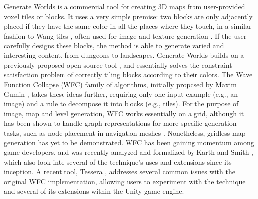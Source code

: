 \documentclass[journal]{IEEEtran}
\begin{document}
Generate Worlds \cite{dykeman2019introducing} is a commercial tool for creating 3D
maps from user-provided voxel tiles or blocks. It uses a very simple premise: two blocks
are only adjacently placed if they have the same color in all the places where they touch,
in a similar fashion to Wang tiles \cite{wang1961proving}, often used for image and
texture generation \cite{cohen2003wang,lagae2009wang}. If the user carefully designs
these blocks, the method is able to generate varied and interesting content, from dungeons
to landscapes. Generate Worlds builds on a previously proposed open-source tool
\cite{dykeman2017procedural}, and essentially solves the constraint satisfaction problem
of correctly tiling blocks according to their colors. The Wave Function Collapse (WFC)
family of algorithms, initially proposed by Maxim Gumin \cite{gumin2016wfc}, takes these
ideas further, requiring only one input example (e.g., an image) and a rule to decompose it
into blocks (e.g., tiles). For the purpose of image, map and level generation, WFC works
essentially on a grid, although it has been shown to handle graph representations for more
specific generation tasks, such as node placement in navigation meshes \cite{kim2019automatic}.
Nonetheless, gridless map generation has yet to be demonstrated. WFC has been gaining
momentum among game developers, and was recently analyzed and formalized by Karth and Smith
\cite{karth2021wavefunctioncollapse}, which also look into several of the technique's uses
and extensions since its inception. A recent tool, Tessera \cite{newgas2021tessera},
addresses several common issues with the original WFC implementation, allowing users to
experiment with the technique and several of its extensions within the Unity game engine.
\end{document}
